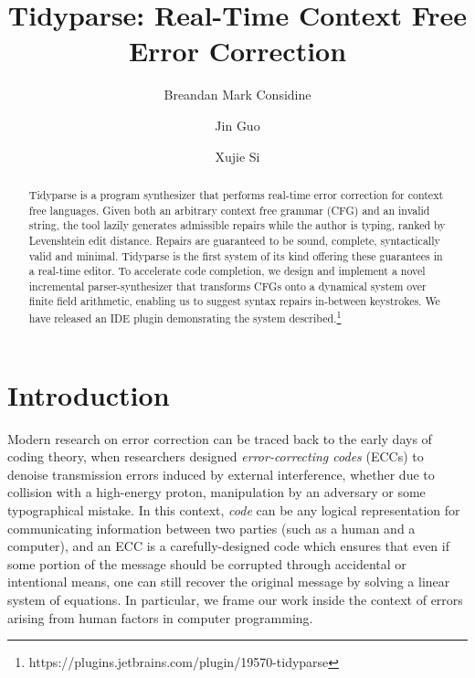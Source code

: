 \documentclass[sigplan,nonacm]{acmart}\settopmatter{printfolios=false,printccs=false,printacmref=false}
\begin{document}
\title{Tidyparse: Real-Time Context Free Error Correction}
\begin{abstract}
Tidyparse is a program synthesizer that performs real-time error correction for context free languages.
Given both an arbitrary context free grammar (CFG) and an invalid string, the tool lazily generates admissible repairs while the author is typing, ranked by Levenshtein edit distance.
 Repairs are guaranteed to be sound, complete, syntactically valid and minimal.
 Tidyparse is the first system of its kind offering these guarantees in a real-time editor. To accelerate code completion, we design and implement a novel incremental parser-synthesizer that transforms CFGs onto a dynamical system over finite field arithmetic, enabling us to suggest syntax repairs in-between keystrokes. We have released an IDE plugin demonsrating the system described.\footnote{https://plugins.jetbrains.com/plugin/19570-tidyparse}
\end{abstract}

\author{Breandan Mark Considine}

\author{Jin Guo}

\author{Xujie Si}

\maketitle

\section{Introduction}

Modern research on error correction can be traced back to the early days of coding theory, when researchers designed \textit{error-correcting codes} (ECCs) to denoise transmission errors induced by external interference, whether due to collision with a high-energy proton, manipulation by an adversary or some typographical mistake. In this context, \textit{code} can be any logical representation for communicating information between two parties (such as a human and a computer), and an ECC is a carefully-designed code which ensures that even if some portion of the message should be corrupted through accidental or intentional means, one can still recover the original message by solving a linear system of equations. In particular, we frame our work inside the context of errors arising from human factors in computer programming.
\end{document}
